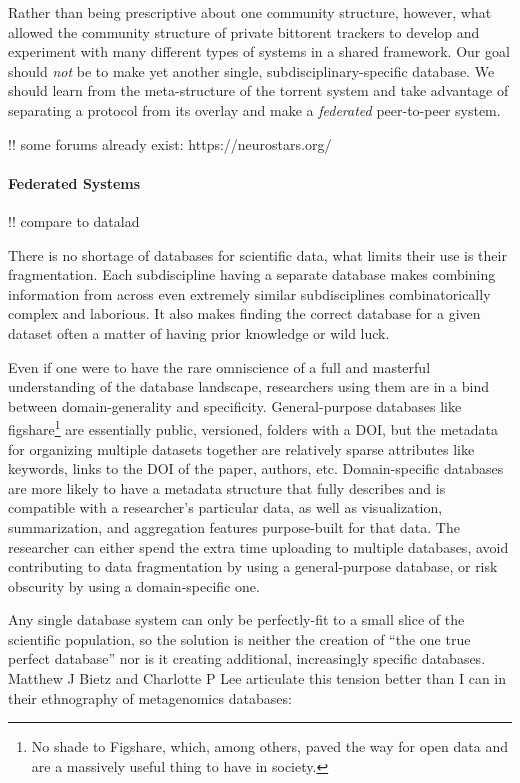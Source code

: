 \documentclass{article}
\begin{document}
Rather than being prescriptive about one community structure, however,
what allowed the community structure of private bittorent trackers to
develop and experiment with many different types of systems in a shared
framework. Our goal should \emph{not} be to make yet another single,
subdisciplinary-specific database. We should learn from the
meta-structure of the torrent system and take advantage of separating a
protocol from its overlay and make a \emph{federated} peer-to-peer
system.

!! some forums already exist: https://neurostars.org/

\hypertarget{federated-systems}{%
\paragraph{Federated Systems}\label{federated-systems}}

!! compare to datalad

There is no shortage of databases for scientific data, what limits their
use is their fragmentation. Each subdiscipline having a separate
database makes combining information from across even extremely similar
subdisciplines combinatorically complex and laborious. It also makes
finding the correct database for a given dataset often a matter of
having prior knowledge or wild luck.

Even if one were to have the rare omniscience of a full and masterful
understanding of the database landscape, researchers using them are in a
bind between domain-generality and specificity. General-purpose
databases like figshare\footnote{No shade to Figshare, which, among
  others, paved the way for open data and are a massively useful thing
  to have in society.} are essentially public, versioned, folders with a
DOI, but the metadata for organizing multiple datasets together are
relatively sparse attributes like keywords, links to the DOI of the
paper, authors, etc. Domain-specific databases are more likely to have a
metadata structure that fully describes and is compatible with a
researcher's particular data, as well as visualization, summarization,
and aggregation features purpose-built for that data. The researcher can
either spend the extra time uploading to multiple databases, avoid
contributing to data fragmentation by using a general-purpose database,
or risk obscurity by using a domain-specific one.

Any single database system can only be perfectly-fit to a small slice of
the scientific population, so the solution is neither the creation of
``the one true perfect database'' nor is it creating additional,
increasingly specific databases. Matthew J Bietz and Charlotte P Lee
articulate this tension better than I can in their ethnography of
metagenomics databases:
\end{document}
